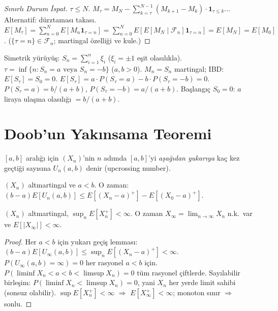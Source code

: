 \begin{proof}[Sınırlı Durum İspat]
$\tau \leq N$. $M_\tau = M_N - \sum_{k=\tau}^{N-1}(M_{k+1}-M_k) \cdot \mathbf{1}_{\tau \leq k}$...
Alternatif: dürztaması takası.
$E[M_\tau] = \sum_{n=0}^N E[M_n \mathbf{1}_{\tau=n}] = \sum_{n=0}^N E[E[M_N\mid\mathcal{F}_n]\mathbf{1}_{\tau=n}]
= E[M_N] = E[M_0]$.
($\{\tau=n\} \in \mathcal{F}_n$; martingal özelliği ve kule.)
\end{proof}

\begin{ornek}
Simetrik yürüyüş: $S_n = \sum_{i=1}^n \xi_i$ ($\xi_i = \pm1$ eşit olasılıkla).
$\tau = \inf\{n: S_n = a \text{ veya } S_n = -b\}$ ($a,b > 0$).
$M_n = S_n$ martingal; IBD: $E[S_\tau] = S_0 = 0$.
$E[S_\tau] = a \cdot P(S_\tau=a) - b \cdot P(S_\tau=-b) = 0$.
$P(S_\tau=a) = b/(a+b)$, $P(S_\tau=-b) = a/(a+b)$.
Başlangıç $S_0 = 0$: $a$ liraya ulaşma olasılığı $= b/(a+b)$.
\end{ornek}

\section{Doob'un Yakınsama Teoremi}
\label{sec:doob_yaklinsama}

\begin{tanim}
$[a,b]$ aralığı için $(X_n)$'nin $n$ adımda $[a,b]$'yi \emph{aşağıdan yukarıya}
kaç kez geçtiği sayısına $U_n(a,b)$ denir (upcrossing number).
\end{tanim}

\begin{lemma}
\label{lem:doob_upcrossing}
$(X_n)$ altmartingal ve $a < b$. O zaman:
$(b-a) E[U_n(a,b)] \leq E[(X_n-a)^+] - E[(X_0-a)^+]$.
\end{lemma}

\begin{teorem}
\label{thm:doob_yaklinsama}
$(X_n)$ altmartingal, $\sup_n E[X_n^+] < \infty$. O zaman
$X_\infty = \lim_{n\to\infty} X_n$ n.k.\ var ve $E[|X_\infty|] < \infty$.
\end{teorem}

\begin{proof}
Her $a < b$ için yukarı geçiş lemması:
$(b-a)E[U_\infty(a,b)] \leq \sup_n E[(X_n-a)^+] < \infty$.
$P(U_\infty(a,b) = \infty) = 0$ her rasyonel $a < b$ için.
$P(\liminf X_n < a < b < \limsup X_n) = 0$ tüm rasyonel çiftlerde.
Sayılabilir birleşim: $P(\liminf X_n < \limsup X_n) = 0$,
yani $X_n$ her yerde limit sahibi (sonsuz olabilir).
$\sup E[X_n^+] < \infty$ $\Rightarrow$ $E[X_\infty^+] < \infty$; monoton sınır $\Rightarrow$ sonlu.
\end{proof}


